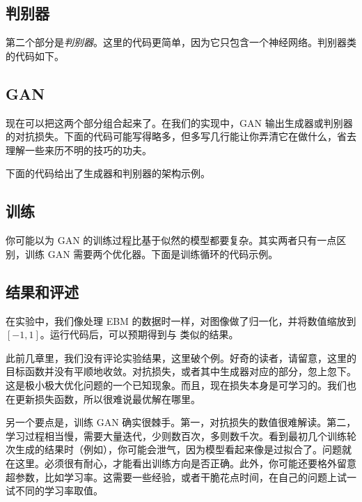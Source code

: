 
\subsection{判别器}

第二个部分是\emph{判别器}。这里的代码更简单，因为它只包含一个神经网络。判别器类的代码如下。


\subsection{GAN}

现在可以把这两个部分组合起来了。在我们的实现中，GAN 输出生成器或判别器的对抗损失。下面的代码可能写得略多，但多写几行能让你弄清它在做什么，省去理解一些来历不明的技巧的功夫。


下面的代码给出了生成器和判别器的架构示例。


\subsection{训练}

你可能以为 GAN 的训练过程比基于似然的模型都要复杂。其实两者只有一点区别，训练 GAN 需要两个优化器。下面是训练循环的代码示例。


\subsection{结果和评述}

在实验中，我们像处理 EBM 的数据时一样，对图像做了归一化，并将数值缩放到 $[-1,1]$。运行代码后，可以预期得到与 类似的结果。

此前几章里，我们没有评论实验结果，这里破个例。好奇的读者，请留意，这里的目标函数并没有平顺地收敛。对抗损失，或者其中生成器对应的部分，忽上忽下。这是极小极大优化问题的一个已知现象。而且，现在损失本身是可学习的。我们也在更新损失函数，所以很难说最优解在哪里。

另一个要点是，训练 GAN 确实很棘手。第一，对抗损失的数值很难解读。第二，学习过程相当慢，需要大量迭代，少则数百次，多则数千次。看到最初几个训练轮次生成的结果时（例如），你可能会泄气，因为模型看起来像是过拟合了。问题就在这里。必须很有耐心，才能看出训练方向是否正确。此外，你可能还要格外留意超参数，比如学习率。这需要一些经验，或者干脆花点时间，在自己的问题上试一试不同的学习率取值。

